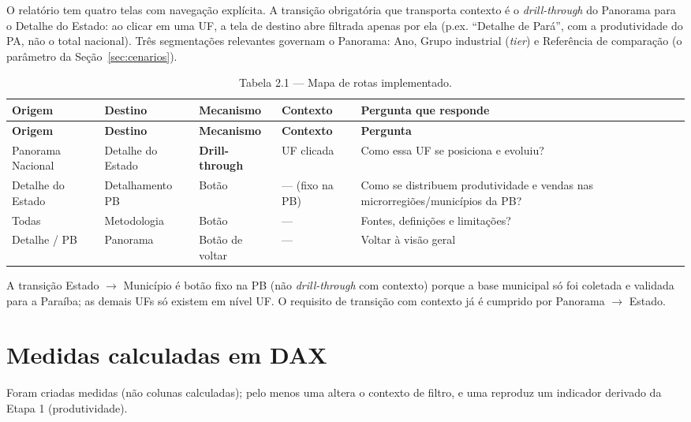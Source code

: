 \documentclass[11pt,a4paper]{article}
\begin{document}
O relatório tem quatro telas com navegação explícita. A transição obrigatória que transporta
contexto é o \textit{drill-through} do Panorama para o Detalhe do Estado: ao clicar em uma UF, a
tela de destino abre filtrada apenas por ela (p.ex. ``Detalhe de Pará'', com a produtividade do
PA, não o total nacional). Três segmentações relevantes governam o Panorama: Ano, Grupo industrial
(\textit{tier}) e Referência de comparação (o parâmetro da Seção~\ref{sec:cenarios}).

\begin{longtable}{L{3.0cm} L{3.0cm} L{2.6cm} L{2.4cm} L{3.0cm}}
\caption{Tabela 2.1 — Mapa de rotas implementado.}\\
\toprule
\textbf{Origem} & \textbf{Destino} & \textbf{Mecanismo} & \textbf{Contexto} & \textbf{Pergunta que responde}\\
\midrule
\endfirsthead
\toprule
\textbf{Origem} & \textbf{Destino} & \textbf{Mecanismo} & \textbf{Contexto} & \textbf{Pergunta}\\
\midrule
\endhead
\bottomrule
\endfoot
Panorama Nacional & Detalhe do Estado & \textbf{Drill-through} & UF clicada & Como essa UF se posiciona e evoluiu?\\
\addlinespace
Detalhe do Estado & Detalhamento PB & Botão & — (fixo na PB) & Como se distribuem produtividade e vendas nas microrregiões/municípios da PB?\\
\addlinespace
Todas & Metodologia & Botão & — & Fontes, definições e limitações?\\
\addlinespace
Detalhe / PB & Panorama & Botão de voltar & — & Voltar à visão geral\\
\end{longtable}

A transição Estado $\rightarrow$ Município é botão fixo na PB (não \textit{drill-through} com
contexto) porque a base municipal só foi coletada e validada para a Paraíba; as demais UFs só
existem em nível UF. O requisito de transição com contexto já é cumprido por Panorama
$\rightarrow$ Estado.

\section{Medidas calculadas em DAX}

Foram criadas medidas (não colunas calculadas); pelo menos uma altera o contexto de filtro, e uma
reproduz um indicador derivado da Etapa 1 (produtividade).
\end{document}
